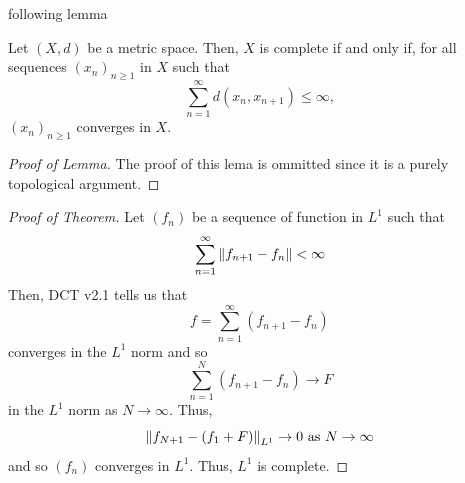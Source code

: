 \documentclass[11pt,leqno,oneside]{amsbook}
\numberwithin{thm}{section}
\begin{document}
following lemma
\begin{lem}\label{series-criterion-for-completeness}
  Let \((X,d)\) be a metric space. Then, \(X\) is complete if and only
  if, for all sequences \((x_n)_{n \geq 1}\) in \(X\) such that \[
    \sum_{n=1}^\infty d(x_n,x_{n+1}) \leq \infty,
  \]
  \((x_n)_{n \geq 1}\) converges in \(X\).
\end{lem}
\begin{proof}[Proof of Lemma]
  The proof of this lema is ommitted since it is a purely topological argument.
\end{proof}
\begin{proof}[Proof of Theorem]
  Let \((f_n)\) be a sequence of function in \(L^1\) such that \[
    \sum_{n=1}^\infty \norm[f_{n+1}-f_n] < \infty
  \]
  Then, DCT v2.1 tells us that \[
    f = \sum_{n=1}^\infty \left( f_{n+1} - f_n \right)
  \]
  converges in the \(L^1\) norm and so \[
    \sum_{n=1}^N (f_{n+1}-f_n) \to F
  \]
  in the \(L^1\) norm as \(N \to \infty\). Thus, \[
    \norm[f_{N+1} - (f_1+F)]_{L^1} \to 0 \text{ as } N \to \infty
  \]
  and so \((f_n)\) converges in \(L^1\). Thus, \(L^1\) is complete.
\end{proof}
\end{document}
